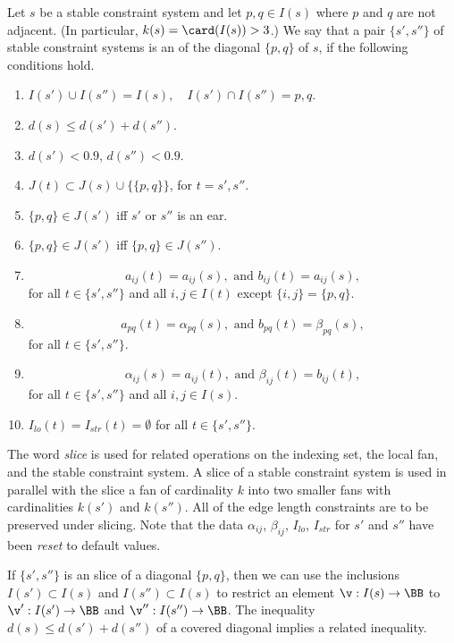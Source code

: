 \begin{definition}[slice]
 Let $s$ be a stable constraint system and let $p,q\in I(s)$ where $p$ and
  $q$ are not adjacent.  (In particular, $k(s)=\card(I(s))>3$.)  We
  say that a pair $\{s',s''\}$ of stable constraint systems is an
 of  the
  diagonal $\{p,q\}$ of $s$, if the following conditions hold.
\begin{enumerate}
\item $I(s')\cup  I(s'') = I(s),\quad I(s')\cap I(s'') = {p,q}$.
\item $d(s) \le d(s') + d(s'')$.
\item $d(s') < 0.9$, $d(s'') < 0.9$.
\item $J(t) \subset J(s) \cup \{\{p,q\}\}$, for $t = s',s''$.  
\item $\{p,q\}\in J(s')$ iff $s'$ or $s''$ is an ear.
\item $\{p,q\}\in J(s')$ iff $\{p,q\}\in J(s'')$.
\item 
\[
a_{ij}(t) = a_{ij}(s), \text{ and } b_{ij}(t) = a_{ij}(s),
\]
for all $t\in \{s',s''\}$ and all $i,j\in I(t)$ except $\{i,j\} = \{p,q\}$.
\item 
\[
a_{p q}(t)=\alpha_{p q}(s), \text{ and } b_{p q}(t)= \beta _{p q}(s),
\]
for all $t\in \{s',s''\}$.
\item
\[
\alpha_{i j}(s) = a_{i j}(t), \text{ and } \beta_{i j}(t) = b_{i j}(t),
\]
for all $t\in\{s',s''\}$ and all $i,j\in I(s)$.
\item
$I_{lo}(t)=I_{str}(t)=\emptyset$ for all  $t\in \{s',s''\}$.
\end{enumerate}
\end{definition}


The word {\it slice} is used for related operations on the indexing
set, the local fan, and the stable constraint system.  A slice of a
stable constraint system is used in parallel with the slice a fan of
cardinality $k$ into two smaller fans with cardinalities $k(s')$ and
$k(s'')$.  All of the edge length constraints are to be preserved
under slicing.  Note that the data $\alpha_{ij}$, $\beta_{ij}$,
$I_{lo}$, $I_{str}$ for $s'$ and $s''$ have been {\it reset} to
default values.

If $\{s',s''\}$ is an slice of a diagonal $\{p,q\}$, then we can use
the inclusions $I(s')\subset I(s)$ and $I(s'')\subset I(s)$ to
restrict an element $\v:I(s)\to\BB$ to $\v':I(s')\to \BB$ and
$\v'':I(s'')\to \BB$.  The inequality $d(s)\le d(s') + d(s'')$ of a
covered diagonal implies a related inequality.

